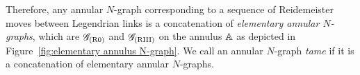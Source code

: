 \begin{center}
\end{center}

Therefore, any annular $N$-graph corresponding to a sequence of Reidemeister moves between Legendrian links is a concatenation of \emph{elementary annular $N$-graphs}, which are  $\mathscr{G}_{{\rm{(R0)}}}$ and $\mathscr{G}_{{\rm{(RIII)}}}$ on the annulus $\mathbb{A}$ as depicted in Figure~\ref{fig:elementary annulus N-graph}.
We call an annular $N$-graph \emph{tame} if it is a concatenation of elementary annular $N$-graphs. 

